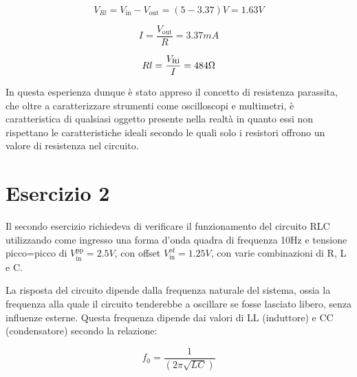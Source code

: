 $$V_{Rl} = V_\text{in}-V_\text{out}=(5-3.37)V=1.63V$$

$$I=\frac{V_\text{out}}{R}=3.37mA$$

$$Rl = \frac{V_\text{Rl}}{I}=484\ohm$$

In questa esperienza dunque è stato appreso il concetto di resistenza parassita, che oltre a caratterizzare strumenti come oscilloscopi e multimetri, è caratteristica di qualsiasi oggetto presente nella realtà in quanto essi non rispettano le caratteristiche ideali secondo le quali solo i resistori offrono un valore di resistenza nel circuito.

\section{Esercizio 2}
Il secondo esercizio richiedeva di verificare il funzionamento del circuito RLC utilizzando come ingresso una forma d'onda quadra di frequenza 10Hz e tensione picco=picco di $V_\text{in}^\text{pp}=2.5V$, con offset $V_\text{in}^\text{of}=1.25V$, con varie combinazioni di R, L e C.

La risposta del circuito dipende dalla frequenza naturale del sistema, ossia la frequenza alla quale il circuito tenderebbe a oscillare se fosse lasciato libero, senza influenze esterne. Questa frequenza dipende dai valori di LL (induttore) e CC (condensatore) secondo la relazione:

$$f_0=\frac{1}{(2\pi\sqrt{LC})}$$

